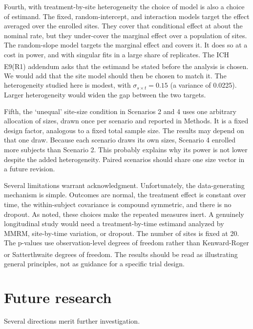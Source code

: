 \documentclass[
  11pt,
]{article}
\begin{document}
Fourth, with treatment-by-site heterogeneity the choice of model is
also a choice of estimand. The fixed, random-intercept, and
interaction models target the effect averaged over the enrolled
sites. They cover that conditional effect at about the nominal rate,
but they under-cover the marginal effect over a population of
sites. The random-slope model targets the marginal effect and covers
it. It does so at a cost in power, and with singular fits in a large
share of replicates. The ICH E9(R1) addendum asks that the estimand
be stated before the analysis is chosen\textsuperscript{}. We would
add that the site model should then be chosen to match it. The
heterogeneity studied here is modest, with \(\sigma_{s \times t} =
0.15\) (a variance of 0.0225). Larger heterogeneity would widen the
gap between the two targets.

Fifth, the `unequal' site-size condition in Scenarios 2 and 4 uses
one arbitrary allocation of sizes, drawn once per scenario and
reported in Methods. It is a fixed design factor, analogous to a
fixed total sample size. The results may depend on that one draw.
Because each scenario draws its own sizes, Scenario 4 enrolled more
subjects than Scenario 2. This probably explains why its power is
not lower despite the added heterogeneity. Paired scenarios should share one size
vector in a future revision.

Several limitations warrant acknowledgment. Unfortunately, the
data-generating mechanism is simple. Outcomes are normal, the
treatment effect is constant over time, the within-subject
covariance is compound symmetric, and there is no dropout. As noted,
these choices make the repeated measures inert. A genuinely
longitudinal study would need a treatment-by-time estimand analyzed
by MMRM, site-by-time variation, or dropout. The number of sites is
fixed at 20. The p-values use observation-level degrees of freedom
rather than Kenward-Roger or Satterthwaite degrees of freedom\textsuperscript{}. The results should be read as illustrating
general principles, not as guidance for a specific trial design.

\section{Future research}\label{future-research}

Several directions merit further investigation.
\end{document}
